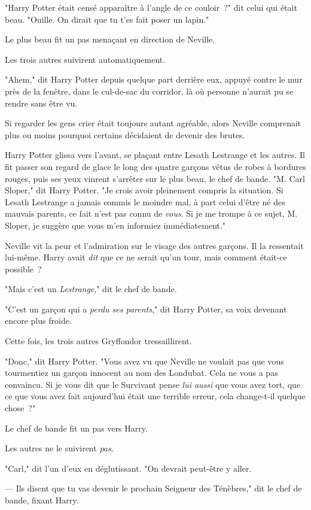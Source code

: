 "Harry Potter était censé apparaître à l'angle de ce couloir~?" dit celui qui était beau. "Ouille. On dirait que tu t'es fait poser un lapin."

Le plus beau fit un pas menaçant en direction de Neville.

Les trois autres suivirent automatiquement.

"Ahem," dit Harry Potter depuis quelque part derrière eux, appuyé contre le mur près de la fenêtre, dans le cul-de-sac du corridor, là où personne n'aurait pu se rendre sans être vu.

Si regarder les gens crier était toujours autant agréable, alors Neville comprenait plus ou moins pourquoi certains décidaient de devenir des brutes.

Harry Potter glissa vers l'avant, se plaçant entre Lesath Lestrange et les autres. Il fit passer son regard de glace le long des quatre garçons vêtus de robes à bordures rouges, puis ses yeux vinrent s'arrêter sur le plus beau, le chef de bande. "M. Carl Sloper," dit Harry Potter. "Je crois avoir pleinement compris la situation. Si Lesath Lestrange a jamais commis le moindre mal, à part celui d'être né des mauvais parents, ce fait n'est pas connu de \emph{vous}. Si je me trompe à ce sujet, M. Sloper, je suggère que vous m'en informiez immédiatement."

Neville vit la peur et l'admiration sur le visage des autres garçons. Il la ressentait lui-même. Harry avait \emph{dit} que ce ne serait qu'un tour, mais comment était-ce possible~?

"Mais c'est un \emph{Lestrange}," dit le chef de bande.

"C'est un garçon qui a \emph{perdu ses parents}," dit Harry Potter, sa voix devenant encore plus froide.

Cette fois, les trois autres Gryffondor tressaillirent.

"Donc," dit Harry Potter. "Vous avez vu que Neville ne voulait pas que vous tourmentiez un garçon innocent au nom des Londubat. Cela ne vous a pas convaincu. Si je vous dit que le Survivant pense \emph{lui aussi} que vous avez tort, que ce que vous avez fait aujourd'hui était une terrible erreur, cela change-t-il quelque chose~?"

Le chef de bande fit un pas vers Harry.

Les autres ne le suivirent \emph{pas}.

"Carl," dit l'un d'eux en déglutissant. "On devrait peut-être y aller.

--- Ils disent que tu vas devenir le prochain Seigneur des Ténèbres," dit le chef de bande, fixant Harry.

